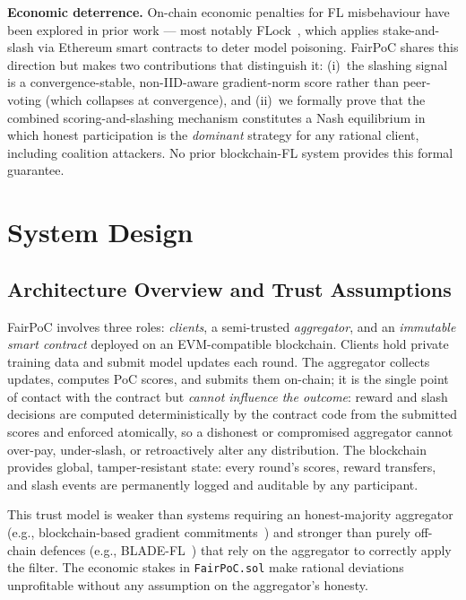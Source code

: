 \documentclass[journal]{IEEEtran}
\theoremstyle{definition}
\theoremstyle{remark}
\begin{document}
\textbf{Economic deterrence.}
On-chain economic penalties for FL misbehaviour have been explored in
prior work --- most notably FLock~\cite{dong2022flock,dong2024flock},
which applies stake-and-slash via Ethereum smart contracts to deter
model poisoning.
FairPoC shares this direction but makes two contributions that
distinguish it: (i)~the slashing signal is a convergence-stable,
non-IID-aware gradient-norm score rather than peer-voting (which
collapses at convergence), and (ii)~we formally prove that the
combined scoring-and-slashing mechanism constitutes a Nash equilibrium
in which honest participation is the \emph{dominant} strategy for any
rational client, including coalition attackers.
No prior blockchain-FL system provides this formal guarantee.

\section{System Design}
\label{sec:design}

\subsection{Architecture Overview and Trust Assumptions}

FairPoC involves three roles: \emph{clients}, a semi-trusted
\emph{aggregator}, and an \emph{immutable smart contract} deployed
on an EVM-compatible blockchain.
Clients hold private training data and submit model updates each
round.
The aggregator collects updates, computes PoC scores, and submits
them on-chain; it is the single point of contact with the contract
but \emph{cannot influence the outcome}: reward and slash decisions
are computed deterministically by the contract code from the
submitted scores and enforced atomically, so a dishonest or
compromised aggregator cannot over-pay, under-slash, or retroactively
alter any distribution.
The blockchain provides global, tamper-resistant state: every round's
scores, reward transfers, and slash events are permanently logged
and auditable by any participant.

This trust model is weaker than systems requiring an honest-majority
aggregator (e.g., blockchain-based gradient commitments~\cite{weng2021deepchain})
and stronger than purely off-chain defences (e.g., BLADE-FL~\cite{bladefl2022})
that rely on the aggregator to correctly apply the filter.
The economic stakes in \texttt{FairPoC.sol} make rational deviations
unprofitable without any assumption on the aggregator's honesty.
\end{document}

